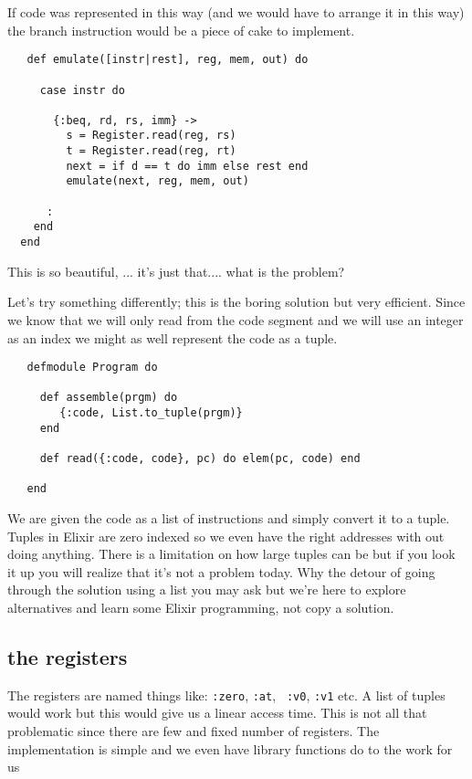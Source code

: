 \documentclass[a4paper,11pt]{article}
\begin{document}
 If code was represented in this way (and we would have to arrange it
 in this way) the branch instruction would be a piece of cake to implement.

\begin{verbatim}
   def emulate([instr|rest], reg, mem, out) do

     case instr do

       {:beq, rd, rs, imm} ->
         s = Register.read(reg, rs)
         t = Register.read(reg, rt)
         next = if d == t do imm else rest end
         emulate(next, reg, mem, out)

      :
    end
  end
 \end{verbatim}
 
 This is so beautiful, ... it's just that.... what is the problem?

 Let's try something differently; this is the boring solution but very
 efficient. Since we know that we will only read from the code segment
 and we will use an integer as an index we might as well represent the
 code as a tuple.

 \begin{verbatim}
   defmodule Program do 

     def assemble(prgm) do
        {:code, List.to_tuple(prgm)}
     end

     def read({:code, code}, pc) do elem(pc, code) end
   
   end
\end{verbatim}
 
We are given the code as a list of instructions and simply convert it
to a tuple. Tuples in Elixir are zero indexed so we even have the
right addresses with out doing anything. There is a limitation on how
large tuples can be but if you look it up you will realize that it's
not a problem today. Why the detour of going through the solution
using a list you may ask but we're here to explore alternatives and
learn some Elixir programming, not copy a solution.

\subsection{the registers}

The registers are named things like: {\tt :zero}, {\tt :at}, {\tt
  :v0}, {\tt :v1} etc. A list of tuples would work but this would give
us a linear access time. This is not all that problematic since there
are few and fixed number of registers. The implementation is simple
and we even have library functions do to the work for us
\end{document}
